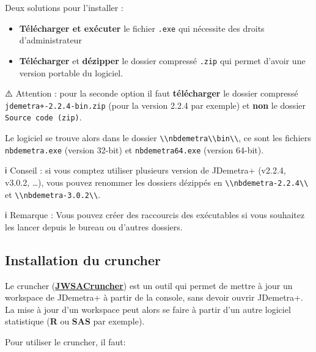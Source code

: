 \documentclass[
]{article}
\providecommand{\tightlist}{%
  \setlength{\itemsep}{0pt}\setlength{\parskip}{0pt}}
\begin{document}
Deux solutions pour l'installer :

\begin{itemize}
\tightlist
\item
  \textbf{Télécharger et exécuter} le fichier \texttt{.exe} qui
  nécessite des droits d'administrateur
\item
  \textbf{Télécharger} et \textbf{dézipper} le dossier compressé
  \texttt{.zip} qui permet d'avoir une version portable du logiciel.
\end{itemize}

⚠️ Attention : pour la seconde option il faut \textbf{télécharger} le
dossier compressé \texttt{jdemetra+-2.2.4-bin.zip} (pour la version
2.2.4 par exemple) et \textbf{non} le dossier
\texttt{Source\ code\ (zip)}.

Le logiciel se trouve alors dans le dossier
\textcolor{windows_path_color}{\nolinkurl{\\nbdemetra\\bin\\}}, ce sont
les fichiers \texttt{nbdemetra.exe} (version 32-bit) et
\texttt{nbdemetra64.exe} (version 64-bit).

ℹ️ Conseil : si vous comptez utiliser plusieurs version de JDemetra+
(v2.2.4, v3.0.2, \ldots), vous pouvez renommer les dossiers dézippés en
\textcolor{windows_path_color}{\nolinkurl{\\nbdemetra-2.2.4\\}} et
\textcolor{windows_path_color}{\nolinkurl{\\nbdemetra-3.0.2\\}}.

ℹ️ Remarque : Vous pouvez créer des raccourcis des exécutables si vous
souhaitez les lancer depuis le bureau ou d'autres dossiers.

\hypertarget{installation-du-cruncher}{%
\subsection{Installation du cruncher}\label{installation-du-cruncher}}

Le cruncher
(\href{https://github.com/jdemetra/jwsacruncher}{\textbf{JWSACruncher}})
est un outil qui permet de mettre à jour un workspace de JDemetra+ à
partir de la console, sans devoir ouvrir JDemetra+. La mise à jour d'un
workspace peut alors se faire à partir d'un autre logiciel statistique
(\textbf{R} ou \textbf{SAS} par exemple).

Pour utiliser le cruncher, il faut:
\end{document}
